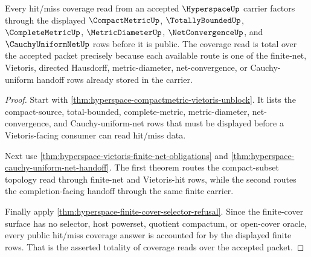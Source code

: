 \begin{theorem}
\label{thm:hyperspace-hit-miss-coverage-totality}
Every hit/miss coverage read from an accepted $\HyperspaceUp$ carrier factors through the displayed $\CompactMetricUp$, $\TotallyBoundedUp$, $\CompleteMetricUp$, $\MetricDiameterUp$, $\NetConvergenceUp$, and $\CauchyUniformNetUp$ rows before it is public. The coverage read is total over the accepted packet precisely because each available route is one of the finite-net, Vietoris, directed Hausdorff, metric-diameter, net-convergence, or Cauchy-uniform handoff rows already stored in the carrier.
\end{theorem}
\begin{proof}
Start with \autoref{thm:hyperspace-compactmetric-vietoris-unblock}. It lists the compact-source, total-bounded, complete-metric, metric-diameter, net-convergence, and Cauchy-uniform-net rows that must be displayed before a Vietoris-facing consumer can read hit/miss data.

Next use \autoref{thm:hyperspace-vietoris-finite-net-obligations} and \autoref{thm:hyperspace-cauchy-uniform-net-handoff}. The first theorem routes the compact-subset topology read through finite-net and Vietoris-hit rows, while the second routes the completion-facing handoff through the same finite carrier.

Finally apply \autoref{thm:hyperspace-finite-cover-selector-refusal}. Since the finite-cover surface has no selector, host powerset, quotient compactum, or open-cover oracle, every public hit/miss coverage answer is accounted for by the displayed finite rows. That is the asserted totality of coverage reads over the accepted packet.
\end{proof}
